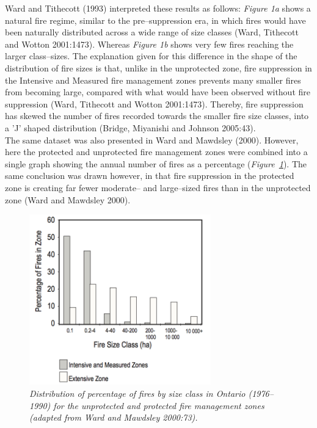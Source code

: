 \begin{spacing}{1.5}
\clearpage

\noindent Ward and Tithecott (1993) interpreted these results as follows: \emph{Figure 1a} shows a natural fire regime, similar to the pre--suppression era, in which fires would have been naturally distributed across a wide range of size classes (Ward, Tithecott and Wotton 2001:1473). Whereas \emph{Figure 1b} shows very few fires reaching the larger class--sizes. The explanation given for this difference in the shape of the distribution of fire sizes is that, unlike in the unprotected zone, fire suppression in the Intensive and Measured fire management zones prevents many smaller fires from becoming large, compared with what would have been observed without fire suppression (Ward, Tithecott and Wotton 2001:1473). Thereby, fire suppression has skewed the number of fires recorded towards the smaller fire size classes, into a 'J' shaped distribution (Bridge, Miyanishi and Johnson 2005:43). \\

\noindent The same dataset was also presented in Ward and Mawdsley (2000). However, here the protected and unprotected fire management zones were combined into a single graph showing the annual number of fires as a  percentage (\emph{Figure~\ref{fig4}}). The same conclusion was drawn however, in that fire suppression in the protected zone is creating far fewer moderate-- and large--sized fires than in the unprotected zone (Ward and Mawdsley 2000). \\

\begin{figure}[h!]
  \centering
    \includegraphics[width=0.7\textwidth]{media/fig4}
      \caption[Distribution of percentage of fires by size-class]{\emph{Distribution of percentage of fires by size class in Ontario (1976--1990) for the unprotected and protected fire management zones (adapted from Ward and Mawdsley 2000:73).}}
        \label{fig4}
\end{figure}


\end{spacing}
